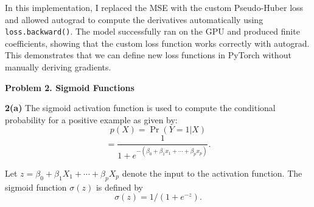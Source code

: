 \documentclass[10pt]{article}
\begin{document}
In this implementation, I replaced the MSE with the custom Pseudo-Huber loss and allowed autograd to compute the derivatives automatically using \texttt{loss.backward()}. The model successfully ran on the GPU and produced finite coefficients, showing that the custom loss function works correctly with autograd. This demonstrates that we can define new loss functions in PyTorch without manually deriving gradients.

\newpage

\textbf{Problem 2. Sigmoid Functions}

\textbf{2(a)} The sigmoid activation function is used to compute the conditional probability for a positive example as given by:
\[
p(X) = \Pr(Y = 1|X)
\]
\[
= \frac{1}{1 + e^{-(\beta_0 + \beta_1 x_1 + \cdots + \beta_p x_p)}}.
\]

Let $z = \beta_0 + \beta_1 X_1 + \cdots + \beta_p X_p$ denote the input to the activation function. The sigmoid function $\sigma(z)$ is defined by
\[
\sigma(z) = 1/(1 + e^{-z}).
\]
\end{document}
